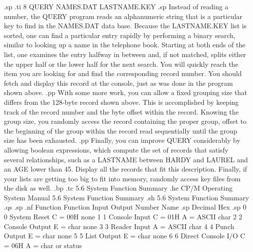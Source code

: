 .sp
.ti 8
QUERY NAMES.DAT LASTNAME.KEY
.sp
Instead of reading a number, the QUERY program reads an 
alphanumeric string that is a particular key to find in the 
NAMES.DAT data base.  Because the LASTNAME.KEY list is sorted, one 
can find a particular entry rapidly by performing a binary 
search, similar to looking up a name in the telephone book.  
Starting at both ends of the list, one examines the 
entry halfway in between and, if not matched, splits either the 
upper half or the lower half for the next search.  You will 
quickly reach the item you are looking for and find the 
corresponding record number.  You should fetch and display 
this record at the console, just as was done in the program shown 
above.
.pp
With some more work, you can allow a fixed grouping size 
that differs from the 128-byte record shown above.  This is 
accomplished by keeping track of the record number and the 
byte offset within the record.  Knowing the group size, you 
randomly access the record containing the proper group, offset 
to the beginning of the group within the record read sequentially 
until the group size has been exhausted.
.pp
Finally, you can improve QUERY considerably by allowing boolean 
expressions, which compute the set of records that satisfy 
several relationships, such as a LASTNAME between HARDY and 
LAUREL and an AGE lower than 45.  Display all the records that 
fit this description.  Finally, if your lists are getting 
too big to fit into memory, randomly access key 
files from the disk as well.
.bp
.tc    5.6  System Function Summary
.he CP/M Operating System Manual         5.6  System Function Summary
.sh
5.6  System Function Summary
.qs
.sp
.nf
Function        Function                Input                Output
Number          Name
.sp
Decimal     Hex
.sp
 0           0   System Reset            C = 00H              none
 1           1   Console Input           C = 01H              A = ASCII char
 2           2   Console Output          E = char             none
 3           3   Reader Input                                 A = ASCII char
 4           4   Punch Output            E = char             none
 5           5   List Output             E = char             none
 6           6   Direct Console I/O      C = 06H              A = char or status


